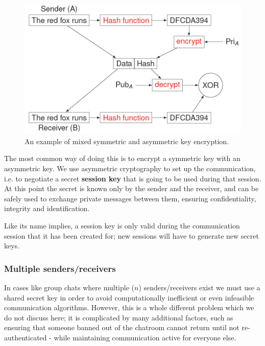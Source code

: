 \begin{figure}[H]
\centering
\includegraphics[scale=0.5]{img/mix.png}
\decoRule
\caption{An example of mixed symmetric and asymmetric key encryption.}
\label{fig:mix}
\end{figure}

The most common way of doing this is to encrypt a symmetric key with an asymmetric key. We use asymmetric cryptography to set up the communication, i.e. to negotiate a secret \textbf{session key} that is going to be used during that session. At this point the secret is known only by the sender and the receiver, and can be safely used to exchange private messages between them, ensuring confidentiality, integrity and identification.

Like its name implies, a session key is only valid during the communication session that it has been created for; new sessions will have to generate new secret keys.


\subsubsection{Multiple senders/receivers}
In cases like group chats where multiple ($n$) senders/receivers exist we must use a shared secret key in order to avoid computationally inefficient or even infeasible communication algorithms. However, this is a whole different problem which we do not discuss here; it is complicated by many additional factors, such as ensuring that someone banned out of the chatroom cannot return until not re-authenticated - while maintaining communication active for everyone else.